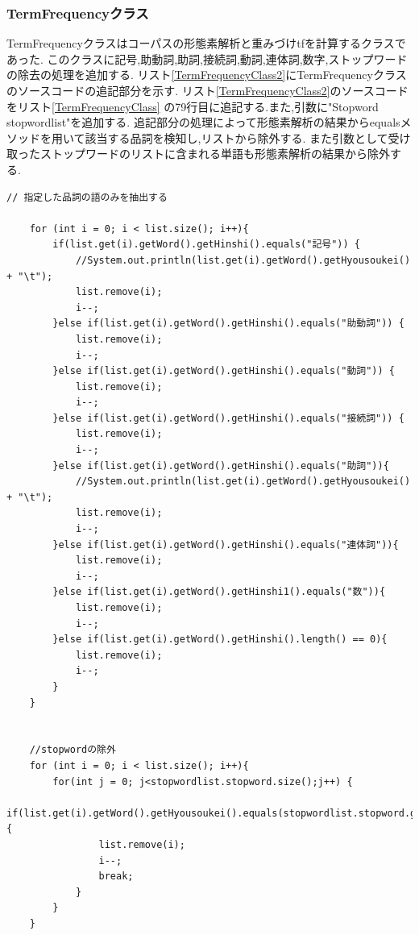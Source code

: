 \documentclass[a4j]{jarticle}
\begin{document}
\subsubsection{TermFrequencyクラス}
TermFrequencyクラスはコーパスの形態素解析と重みづけtfを計算するクラスであった.
このクラスに記号,助動詞,助詞,接続詞,動詞,連体詞,数字,ストップワードの除去の処理を追加する.
リスト\ref{TermFrequencyClass2}にTermFrequencyクラスのソースコードの追記部分を示す.
リスト\ref{TermFrequencyClass2}のソースコードをリスト\ref{TermFrequencyClass}
の79行目に追記する.また,引数に"Stopword stopwordlist"を追加する.
追記部分の処理によって形態素解析の結果からequalsメソッドを用いて該当する品詞を検知し,リストから除外する.
また引数として受け取ったストップワードのリストに含まれる単語も形態素解析の結果から除外する.
\begin{lstlisting}[basicstyle=\ttfamily\footnotesize, frame=single,label=TermFrequencyClass2,caption=TermFrequencyクラスのソースコード(追記)]
	// 指定した品詞の語のみを抽出する

	for (int i = 0; i < list.size(); i++){
		if(list.get(i).getWord().getHinshi().equals("記号")) {
			//System.out.println(list.get(i).getWord().getHyousoukei() + "\t");
			list.remove(i);
			i--;
		}else if(list.get(i).getWord().getHinshi().equals("助動詞")) {
			list.remove(i);
			i--;
		}else if(list.get(i).getWord().getHinshi().equals("動詞")) {
			list.remove(i);
			i--;
		}else if(list.get(i).getWord().getHinshi().equals("接続詞")) {
			list.remove(i);
			i--;
		}else if(list.get(i).getWord().getHinshi().equals("助詞")){
			//System.out.println(list.get(i).getWord().getHyousoukei() + "\t");
			list.remove(i);
			i--;
		}else if(list.get(i).getWord().getHinshi().equals("連体詞")){
			list.remove(i);
			i--;
		}else if(list.get(i).getWord().getHinshi1().equals("数")){
			list.remove(i);
			i--;
		}else if(list.get(i).getWord().getHinshi().length() == 0){
			list.remove(i);
			i--;
		}
	}


	//stopwordの除外
	for (int i = 0; i < list.size(); i++){
		for(int j = 0; j<stopwordlist.stopword.size();j++) {
			if(list.get(i).getWord().getHyousoukei().equals(stopwordlist.stopword.get(j))) {
				list.remove(i);
				i--;
				break;
			}
		}
	}
\end{lstlisting}
\end{document}
